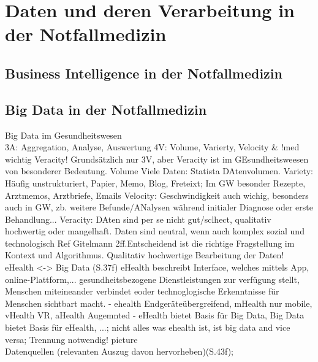 \section{Daten und deren Verarbeitung in der Notfallmedizin} %
\subsection{Business Intelligence in der Notfallmedizin}
\subsection{Big Data in der Notfallmedizin}

Big Data im Gesundheitswesen\\

3A: Aggregation, Analyse, Auswertung
4V: Volume, Varierty, Velocity \& !med wichtig Veracity! 
Grundsätzlich nur 3V, aber Veracity ist im GEsundheitsweesen von besonderer Bedeutung. 
Volume Viele Daten: Statista DAtenvolumen.
Variety: Häufig unstrukturiert, Papier, Memo, Blog, Freteixt; Im GW besonder Rezepte, Arztmemos, Arztbriefe, Emails
Velocity: Geschwindigkeit auch wichig, besonders auch in GW, zb. weitere Befunde/ANalysen während initialer Diagnose oder erste Behandlung...
Veracity: DAten sind per se nicht gut/sclhect, qualitativ hochwertig oder mangelhaft. Daten sind neutral, wenn auch komplex sozial und technologisch Ref Gitelmann 2ff.Entscheidend ist die richtige Fragstellung im Kontext und Algorithmus. Qualitativ hochwertige Bearbeitung der Daten! \\

eHealth <-> Big Data (S.37f)
eHealth beschreibt Interface, welches mittels App, online-Plattform,... gesundheitsbezogene Dienstleistungen zur verfügung stellt, Menschen miteineander verbindet eoder technoglogische Erkenntnisse für Menschen sichtbart macht. 
- ehealth Endgeräteübergreifend, mHealth nur mobile, vHealth VR, aHealth Augemnted
- eHealth bietet Basis für Big Data, Big Data bietet Basis für eHealth, ...; nicht alles was ehealth ist, ist big data and vice versa; Trennung notwendig! picture\\

Datenquellen (relevanten Auszug davon hervorheben)(S.43f); 

